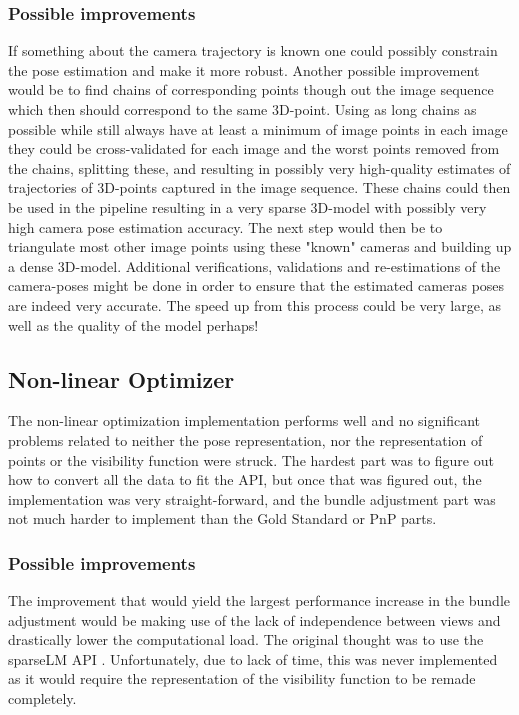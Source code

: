 \subsubsection{Possible improvements}
If something about the camera trajectory is known one could possibly constrain the pose estimation and make it more robust.
Another possible improvement would be to find chains of corresponding points though out the image sequence which then should correspond to the same 3D-point. Using as long chains as possible while still always have at least a minimum of image points in each image they could be cross-validated for each image and the worst points removed from the chains, splitting these, and resulting in possibly very high-quality estimates of trajectories of 3D-points captured in the image sequence. These chains could then be used in the pipeline resulting in a very sparse 3D-model with possibly very high camera pose estimation accuracy. The next step would then be to triangulate most other image points using these "known" cameras and building up a dense 3D-model. Additional verifications, validations and re-estimations of the camera-poses might be done in order to ensure that the estimated cameras poses are indeed very accurate. The speed up from this process could be very large, as well as the quality of the model perhaps!
\newpage

\subsection{Non-linear Optimizer}
The non-linear optimization implementation performs well and no significant problems related to neither the pose representation, nor the representation of points or the visibility function were struck. The hardest part was to figure out how to convert all the data to fit the API, but once that was figured out, the implementation was very straight-forward, and the bundle adjustment part was not much harder to implement than the Gold Standard or PnP parts.

\subsubsection{Possible improvements}
The improvement that would yield the largest performance increase in the bundle adjustment would be making use of the lack of independence between views and drastically lower the computational load. The original thought was to use the sparseLM API \cite{sparseLM}. Unfortunately, due to lack of time, this was never implemented as it would require the representation of the visibility function to be remade completely. 

